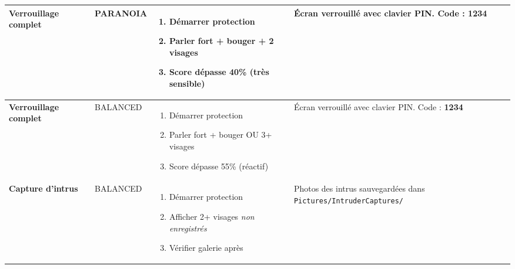 \documentclass[11pt,a4paper]{article}
\begin{document}
\begin{center}
\begin{tabular}{p{3.5cm}p{2cm}p{6cm}p{3cm}}
\midrule

\textbf{Verrouillage complet} & PARANOIA & 
\begin{minipage}[t]{6cm}
\vspace{-2mm}
\begin{enumerate}[leftmargin=*,topsep=0pt]
    \item Démarrer protection
    \item Parler fort + bouger + 2 visages
    \item Score dépasse 40\% (très sensible)
\end{enumerate}
\vspace{-2mm}
\end{minipage} & 
Écran verrouillé avec clavier PIN. Code : \textbf{1234} \\

\midrule

\textbf{Verrouillage complet} & BALANCED & 
\begin{minipage}[t]{6cm}
\vspace{-2mm}
\begin{enumerate}[leftmargin=*,topsep=0pt]
    \item Démarrer protection
    \item Parler fort + bouger OU 3+ visages
    \item Score dépasse 55\% (réactif)
\end{enumerate}
\vspace{-2mm}
\end{minipage} & 
Écran verrouillé avec clavier PIN. Code : \textbf{1234} \\

\midrule

\textbf{Capture d'intrus} & BALANCED & 
\begin{minipage}[t]{6cm}
\vspace{-2mm}
\begin{enumerate}[leftmargin=*,topsep=0pt]
    \item Démarrer protection
    \item Afficher 2+ visages \textit{non enregistrés}
    \item Vérifier galerie après
\end{enumerate}
\vspace{-2mm}
\end{minipage} & 
Photos des intrus sauvegardées dans \texttt{Pictures/IntruderCaptures/} \\

\midrule


\end{tabular}
\end{center}
\end{document}
